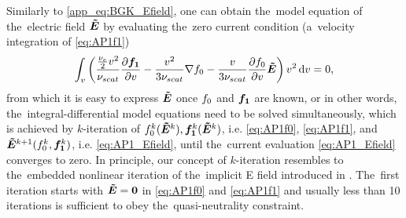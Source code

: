 Similarly to \eqref{app_eq:BGK_Efield}, one can obtain the~model equation of 
the~electric field $\boldsymbol{\tilde{E}}$ by evaluating the~zero current condition 
(a~velocity integration of \eqref{eq:AP1f1})
\begin{equation}
  \int_{v} \left(\frac{\frac{\nu_{e}}{2}v^2}{\nu_{scat}}
  \frac{\partial{\boldsymbol{f_1}}}{\partial{v}} 
  - \frac{v^2}{3\nu_{scat}}
  \nabla f_0 
  - \frac{v}{3\nu_{scat}}\frac{\partial{f_0}}{\partial{v}}\boldsymbol{\tilde{E}}
  \right) v^2\, \text{d}v = 0 ,
  \label{eq:AP1_Efield}
\end{equation}
from which it is easy to express $\boldsymbol{\tilde{E}}$ once $f_0$ and $\boldsymbol{f_1}$ are known, or
in other words, the~integral-differential model equations need to be solved 
simultaneously, which is achieved by $k$-iteration of 
$f_0^k(\boldsymbol{\tilde{E}}^k), \boldsymbol{f_1}^k(\boldsymbol{\tilde{E}}^k)$, i.e. \eqref{eq:AP1f0}, \eqref{eq:AP1f1}, and 
$\boldsymbol{\tilde{E}}^{k+1}(f_0^k, \boldsymbol{f_1}^k)$, i.e.  \eqref{eq:AP1_Efield}, until 
the~current evaluation \eqref{eq:AP1_Efield} converges to zero. In principle,
our concept of $k$-iteration resembles to the~embedded nonlinear iteration
of the~implicit E field introduced in \cite{Kingham_JCP2004}.
The~first iteration starts with $\boldsymbol{\tilde{E}}=\boldsymbol{0}$ in \eqref{eq:AP1f0} and 
\eqref{eq:AP1f1} and usually less than 10 iterations is sufficient to obey
the~quasi-neutrality constraint.

